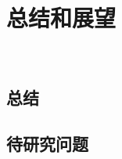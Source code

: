 \documentclass[cs4size,a4paper]{ctexart}
\numberwithin{equation}{section}
\numberwithin{table}{section}
\numberwithin{figure}{section}
\newcommand{\upcite}[1]{\textsuperscript{\textsuperscript{\cite{#1}}}}%
\begin{document}



\section{总结和展望}~\label{总结}


\subsection{总结}

\subsection{待研究问题}~\label{待研究问题}


\newpage
{}
\nocite{*}
%


%
\end{document}
